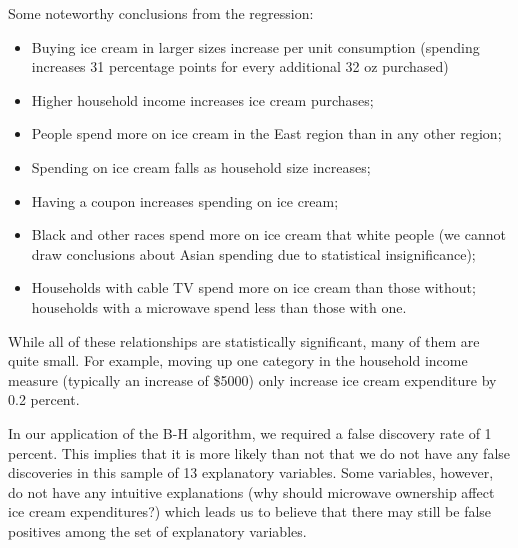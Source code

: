 \documentclass[11pt, fleqn]{article}
\begin{document}
Some noteworthy conclusions from the regression:
\begin{itemize}
  \item Buying ice cream in larger sizes increase per unit consumption (spending increases 31 percentage points for every additional 32 oz purchased)
  \item Higher household income increases ice cream purchases;
  \item People spend more on ice cream in the East region than in any other region;
  \item Spending on ice cream falls as household size increases;
  \item Having a coupon increases spending on ice cream;
  \item Black and other races spend more on ice cream that white people (we cannot draw conclusions about Asian spending due to statistical insignificance);
  \item Households with cable TV spend more on ice cream than those without; households with a microwave spend less than those with one.
\end{itemize}

While all of these relationships are statistically significant, many of them are quite small. For example, moving up one category in the household income measure (typically an increase of \$5000) only increase ice cream expenditure by 0.2 percent.

In our application of the B-H algorithm, we required a false discovery rate of 1 percent. This implies that it is more likely than not that we do not have any false discoveries in this sample of 13 explanatory variables. Some variables, however, do not have any intuitive explanations (why should microwave ownership affect ice cream expenditures?) which leads us to believe that there may still be false positives among the set of explanatory variables.
\end{document}
